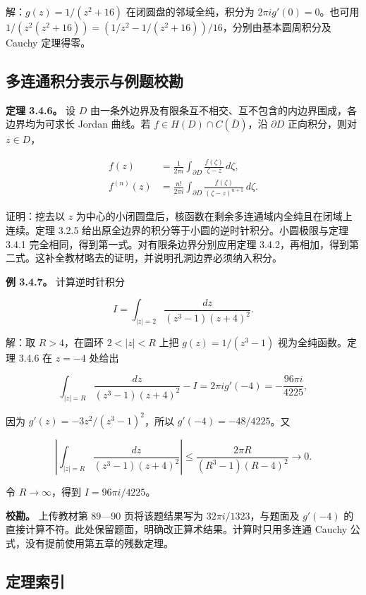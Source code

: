 \documentclass[11pt,a4paper]{article}
\begin{document}
解：\(g(z)=1/(z^2+16)\) 在闭圆盘的邻域全纯，积分为
\(2\pi i g'(0)=0\)。也可用
\(1/(z^2(z^2+16))=(1/z^2-1/(z^2+16))/16\)，分别由基本圆周积分及 Cauchy
定理得零。

\subsection{多连通积分表示与例题校勘}\label{ch03-s4-ux591aux8fdeux901aux79efux5206ux8868ux793aux4e0eux4f8bux9898ux6821ux52d8}

\textbf{定理 3.4.6。} 设 \(D\)
由一条外边界及有限条互不相交、互不包含的内边界围成，各边界均为可求长
Jordan 曲线。若 \(f\in H(D)\cap C(\overline D)\)，沿 \(\partial D\)
正向积分，则对 \(z\in D\)，

\[
\begin{aligned}
f(z)&=\frac1{2\pi i}\int_{\partial D}\frac{f(\zeta)}{\zeta-z}\,d\zeta,\\
f^{(n)}(z)&=\frac{n!}{2\pi i}\int_{\partial D}
\frac{f(\zeta)}{(\zeta-z)^{n+1}}\,d\zeta.
\end{aligned}
\]

证明：挖去以 \(z\)
为中心的小闭圆盘后，核函数在剩余多连通域内全纯且在闭域上连续。定理 3.2.5
给出原全边界的积分等于小圆的逆时针积分。小圆极限与定理 3.4.1
完全相同，得到第一式。对有限条边界分别应用定理
3.4.2，再相加，得到第二式。这补全教材略去的证明，并说明孔洞边界必须纳入积分。

\textbf{例 3.4.7。} 计算逆时针积分

\[
I=\int_{|z|=2}\frac{dz}{(z^3-1)(z+4)^2}.
\]

解：取 \(R>4\)，在圆环 \(2<|z|<R\) 上把 \(g(z)=1/(z^3-1)\)
视为全纯函数。定理 3.4.6 在 \(z=-4\) 处给出

\[
\int_{|z|=R}\frac{dz}{(z^3-1)(z+4)^2}-I
=2\pi i g'(-4)
=-\frac{96\pi i}{4225},
\]

因为 \(g'(z)=-3z^2/(z^3-1)^2\)，所以 \(g'(-4)=-48/4225\)。又

\[
\left|\int_{|z|=R}\frac{dz}{(z^3-1)(z+4)^2}\right|
\le\frac{2\pi R}{(R^3-1)(R-4)^2}\longrightarrow0.
\]

令 \(R\to\infty\)，得到 \(I=96\pi i/4225\)。

\textbf{校勘。} 上传教材第 89---90 页将该题结果写为
\(32\pi i/1323\)，与题面及 \(g'(-4)\)
的直接计算不符。此处保留题面，明确改正算术结果。计算时只用多连通 Cauchy
公式，没有提前使用第五章的残数定理。

\subsection{定理索引}\label{ch03-s4-ux5b9aux7406ux7d22ux5f15}
\end{document}
